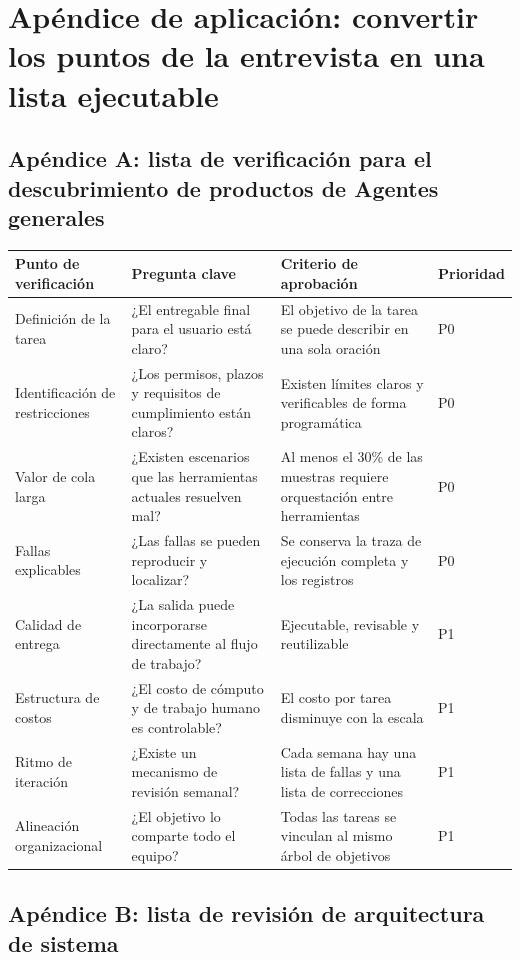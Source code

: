 \documentclass[a4paper]{article}
\begin{document}
\section{Apéndice de aplicación: convertir los puntos de la entrevista en una lista ejecutable}

\subsection{Apéndice A: lista de verificación para el descubrimiento de productos de Agentes generales}

\begin{center}
\begin{tabular}{p{3.1cm}p{3.4cm}p{5.8cm}p{2.2cm}}
\toprule
Punto de verificación & Pregunta clave & Criterio de aprobación & Prioridad \\
\midrule
Definición de la tarea & ¿El entregable final para el usuario está claro? & El objetivo de la tarea se puede describir en una sola oración & P0 \\
Identificación de restricciones & ¿Los permisos, plazos y requisitos de cumplimiento están claros? & Existen límites claros y verificables de forma programática & P0 \\
Valor de cola larga & ¿Existen escenarios que las herramientas actuales resuelven mal? & Al menos el 30\% de las muestras requiere orquestación entre herramientas & P0 \\
Fallas explicables & ¿Las fallas se pueden reproducir y localizar? & Se conserva la traza de ejecución completa y los registros & P0 \\
Calidad de entrega & ¿La salida puede incorporarse directamente al flujo de trabajo? & Ejecutable, revisable y reutilizable & P1 \\
Estructura de costos & ¿El costo de cómputo y de trabajo humano es controlable? & El costo por tarea disminuye con la escala & P1 \\
Ritmo de iteración & ¿Existe un mecanismo de revisión semanal? & Cada semana hay una lista de fallas y una lista de correcciones & P1 \\
Alineación organizacional & ¿El objetivo lo comparte todo el equipo? & Todas las tareas se vinculan al mismo árbol de objetivos & P1 \\
\bottomrule
\end{tabular}
\end{center}

\subsection{Apéndice B: lista de revisión de arquitectura de sistema}
\end{document}
